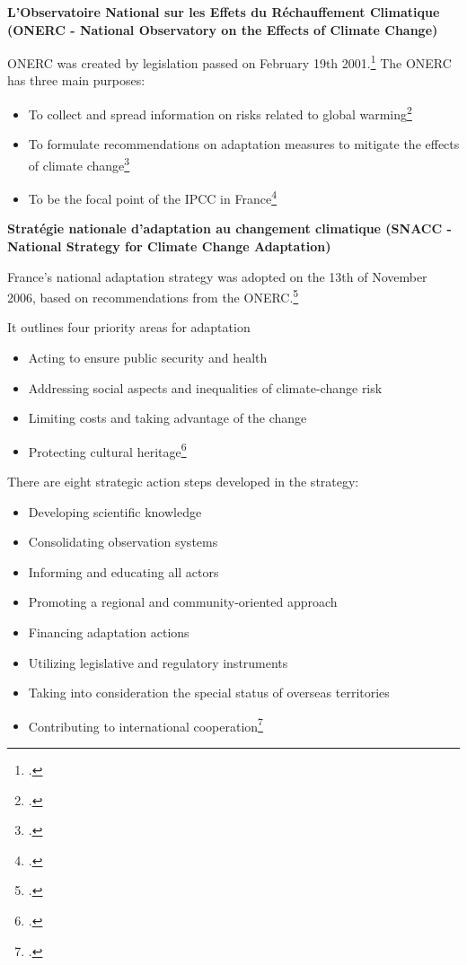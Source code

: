 \textbf{L’Observatoire National sur les Effets du Réchauffement Climatique (ONERC - National Observatory on the Effects of Climate Change)}



ONERC was created by legislation passed on February 19th 2001.\footcite[][]{ONERC}
The ONERC has three main purposes:
\begin{itemize}
	\item To collect and spread information on risks related to global warming\footcite[][]{Reduction2020}
	\item To formulate recommendations on adaptation measures to mitigate the effects of climate change\footcite[][]{Reduction2020}
	\item To be the focal point of the IPCC in France\footcite[][]{ONERC}
\end{itemize}



\textbf{Stratégie nationale d’adaptation au changement climatique (SNACC - National Strategy for Climate Change Adaptation)}



France's national adaptation strategy was adopted on the 13th of November 2006, based on recommendations from the ONERC.\footcite[][]{SNAAC}


It outlines four priority areas for adaptation
\begin{itemize}
	\item Acting to ensure public security and health
	\item Addressing social aspects and inequalities of climate-change risk
	\item Limiting costs and taking advantage of the change
	\item Protecting cultural heritage\footcite[][]{SNAAC}
\end{itemize}


There are eight strategic action steps developed in the strategy:
\begin{itemize}
	\item Developing scientific knowledge
	\item Consolidating observation systems
	\item Informing and educating all actors
	\item Promoting a regional and community-oriented approach
	\item Financing adaptation actions
	\item Utilizing legislative and regulatory instruments
	\item Taking into consideration the special status of overseas territories
	\item Contributing to international cooperation\footcite[][]{SNAAC}
\end{itemize}



